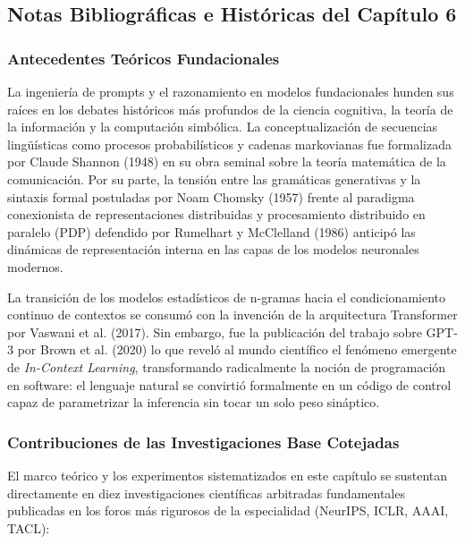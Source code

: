 \newpage
{}
\subsection*{Notas Bibliográficas e Históricas del Capítulo 6}

\subsubsection*{Antecedentes Teóricos Fundacionales}
La ingeniería de prompts y el razonamiento en modelos fundacionales hunden sus raíces en los debates históricos más profundos de la ciencia cognitiva, la teoría de la información y la computación simbólica. La conceptualización de secuencias lingüísticas como procesos probabilísticos y cadenas markovianas fue formalizada por Claude Shannon (1948) en su obra seminal sobre la teoría matemática de la comunicación. Por su parte, la tensión entre las gramáticas generativas y la sintaxis formal postuladas por Noam Chomsky (1957) frente al paradigma conexionista de representaciones distribuidas y procesamiento distribuido en paralelo (PDP) defendido por Rumelhart y McClelland (1986) anticipó las dinámicas de representación interna en las capas de los modelos neuronales modernos.

La transición de los modelos estadísticos de n-gramas hacia el condicionamiento continuo de contextos se consumó con la invención de la arquitectura Transformer por Vaswani et al. (2017). Sin embargo, fue la publicación del trabajo sobre GPT-3 por Brown et al. (2020) lo que reveló al mundo científico el fenómeno emergente de \textit{In-Context Learning}, transformando radicalmente la noción de programación en software: el lenguaje natural se convirtió formalmente en un código de control capaz de parametrizar la inferencia sin tocar un solo peso sináptico.

\subsubsection*{Contribuciones de las Investigaciones Base Cotejadas}
El marco teórico y los experimentos sistematizados en este capítulo se sustentan directamente en diez investigaciones científicas arbitradas fundamentales publicadas en los foros más rigurosos de la especialidad (NeurIPS, ICLR, AAAI, TACL):

